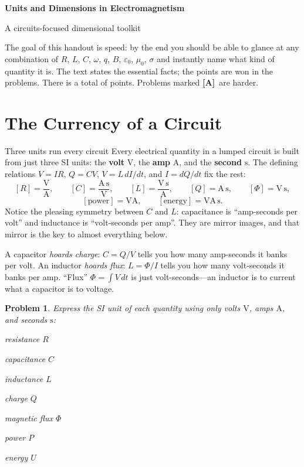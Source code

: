 \documentclass[11pt]{article}
\newcommand{\clearpts}{\addtocounter{tpts}{\value{cpts}} \setcounter{cpts}{0}}
\newcommand{\pts}[1]{\clearpts \setcounter{cpts}{#1}}
\newcommand{\totpts}{\setcounter{endpts}{\totvalue{tpts} + \totvalue{cpts}}\arabic{endpts}}
\newcommand{\ptfmt}[1]{\textbf{\color{ptred}#1\color{black}}}
\newcommand{\advanced}{\!\textbf{\color{advblue}[A]\color{black}}\ }
\theoremstyle{mystyle}
\newtheorem{pproblem}{Problem}
\newcommand{\psettitle}[1]{
    \begin{center}
    \huge \textbf{#1}
    \end{center}
}
\newcommand{\V}{\text{V}}
\newcommand{\A}{\text{A}}
\newcommand{\s}{\text{s}}
\begin{document}
\psettitle{Units and Dimensions in Electromagnetism}
\begin{center}
\large A circuits-focused dimensional toolkit
\end{center}

\noindent
The goal of this handout is speed: by the end you should be able to glance at any
combination of $R$, $L$, $C$, $\omega$, $q$, $B$, $\varepsilon_0$, $\mu_0$, $\sigma$
and instantly name what kind of quantity it is. The text states the essential facts;
the points are won in the problems. There is a total of \ptfmt{\totpts} points.
Problems marked \advanced are harder.

\section{The Currency of a Circuit}

\begin{psidea}{Three units run every circuit}{}
Every electrical quantity in a lumped circuit is built from just three SI units:
the \textbf{volt} $\V$, the \textbf{amp} $\A$, and the \textbf{second} $\s$.
The defining relations $V=IR$, $Q=CV$, $V=L\,dI/dt$, and $I=dQ/dt$ fix the rest:
\[
[R]=\frac{\V}{\A},\qquad
[C]=\frac{\A\,\s}{\V},\qquad
[L]=\frac{\V\,\s}{\A},\qquad
[Q]=\A\,\s,\qquad
[\Phi]=\V\,\s,
\]
\[
[\text{power}]=\V\A,\qquad
[\text{energy}]=\V\A\,\s.
\]
Notice the pleasing symmetry between $C$ and $L$: capacitance is ``amp-seconds per
volt'' and inductance is ``volt-seconds per amp''. They are mirror images, and that
mirror is the key to almost everything below.
\end{psidea}

\begin{psremark*}{}{}
A capacitor \emph{hoards charge}: $C=Q/V$ tells you how many amp-seconds it banks per
volt. An inductor \emph{hoards flux}: $L=\Phi/I$ tells you how many volt-seconds it
banks per amp. ``Flux'' $\Phi=\int V\,dt$ is just volt-seconds---an inductor is to
current what a capacitor is to voltage.
\end{psremark*}

\pts{7}
\begin{pproblem}
Express the SI unit of each quantity using only volts $\V$, amps $\A$, and seconds $\s$:
\begin{subpart}
\item resistance $R$
\item capacitance $C$
\item inductance $L$
\item charge $Q$
\item magnetic flux $\Phi$
\item power $P$
\item energy $U$
\end{subpart}
\end{pproblem}
\end{document}
